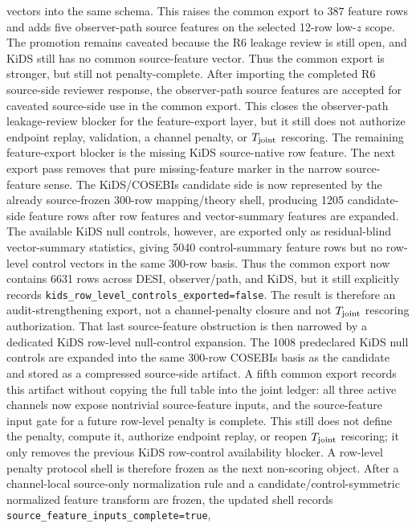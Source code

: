 vectors into the same schema.  This raises the common export to \(387\)
feature rows and adds five observer-path source features on the selected
12-row low-\(z\) scope.  The promotion remains caveated because the R6 leakage
review is still open, and KiDS still has no common source-feature vector.
Thus the common export is stronger, but still not penalty-complete.
After importing the completed R6 source-side reviewer response, the
observer-path source features are accepted for caveated source-side use in the
common export.  This closes the observer-path leakage-review blocker for the
feature-export layer, but it still does not authorize endpoint replay,
validation, a channel penalty, or \(T_{\rm joint}\) rescoring.  The remaining
feature-export blocker is the missing KiDS source-native row feature.
The next export pass removes that pure missing-feature marker in the narrow
source-feature sense.  The KiDS/COSEBIs candidate side is now represented by
the already source-frozen 300-row mapping/theory shell, producing 1205
candidate-side feature rows after row features and vector-summary features are
expanded.  The available KiDS null controls, however, are exported only as
residual-blind vector-summary statistics, giving 5040 control-summary feature
rows but no row-level control vectors in the same 300-row basis.  Thus the
common export now contains 6631 rows across DESI, observer/path, and KiDS, but
it still explicitly records
\texttt{kids\_row\_level\_controls\_exported=false}.  The result is therefore
an audit-strengthening export, not a channel-penalty closure and not
\(T_{\rm joint}\) rescoring authorization.
That last source-feature obstruction is then narrowed by a dedicated KiDS
row-level null-control expansion.  The 1008 predeclared KiDS null controls are
expanded into the same 300-row COSEBIs basis as the candidate and stored as a
compressed source-side artifact.  A fifth common export records this artifact
without copying the full table into the joint ledger: all three active channels
now expose nontrivial source-feature inputs, and the source-feature input gate
for a future row-level penalty is complete.  This still does not define the
penalty, compute it, authorize endpoint replay, or reopen \(T_{\rm joint}\)
rescoring; it only removes the previous KiDS row-control availability blocker.
A row-level penalty protocol shell is therefore frozen as the next non-scoring
object.  After a channel-local source-only normalization rule and a
candidate/control-symmetric normalized feature transform are frozen, the
updated shell records \texttt{source\_feature\_inputs\_complete=true},
